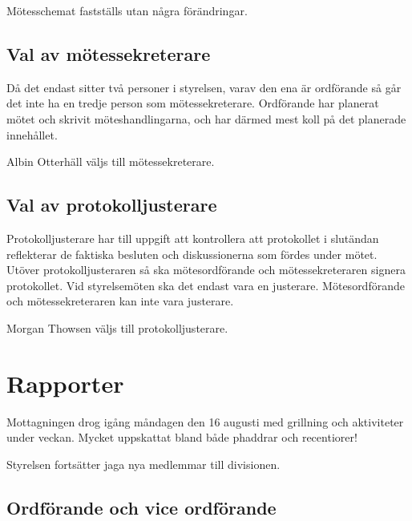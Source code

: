 \documentclass[protokoll]{dvd}
\begin{document}
\begin{beslut}
    \item Mötesschemat fastställs utan några förändringar.
\end{beslut}

\subsection{Val av mötessekreterare}

Då det endast sitter två personer i styrelsen, varav den ena är ordförande så går det inte ha en tredje person som mötessekreterare.
Ordförande har planerat mötet och skrivit möteshandlingarna, och har därmed mest koll på det planerade innehållet.

\begin{beslut}
    \item Albin Otterhäll väljs till mötessekreterare.
\end{beslut}

\subsection{Val av protokolljusterare}

Protokolljusterare har till uppgift att kontrollera att protokollet i slutändan reflekterar de faktiska besluten och diskussionerna som fördes under mötet.
Utöver protokolljusteraren så ska mötesordförande och mötessekreteraren signera protokollet.
Vid styrelsemöten ska det endast vara en justerare.
Mötesordförande och mötessekreteraren kan inte vara justerare.

\begin{beslut}
    \item Morgan Thowsen väljs till protokolljusterare.
\end{beslut}

\section{Rapporter}

Mottagningen drog igång måndagen den 16 augusti med grillning och aktiviteter under veckan.
Mycket uppskattat bland både phaddrar och recentiorer!

Styrelsen fortsätter jaga nya medlemmar till divisionen.

\subsection{Ordförande och vice ordförande}
\end{document}
